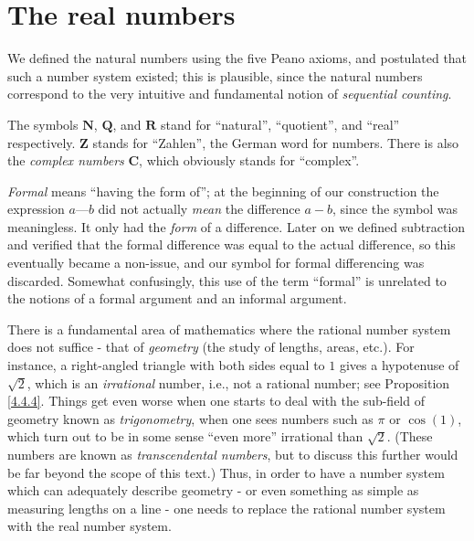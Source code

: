 \chapter{The real numbers}\label{ch 5}

\begin{note}
    We defined the natural numbers using the five Peano axioms, and postulated that such a number system existed;
    this is plausible, since the natural numbers correspond to the very intuitive and fundamental notion of \emph{sequential counting}.
\end{note}

\begin{note}
    The symbols \(\mathbf{N}\), \(\mathbf{Q}\), and \(\mathbf{R}\) stand for ``natural'', ``quotient'', and ``real'' respectively.
    \(\mathbf{Z}\) stands for ``Zahlen'', the German word for numbers.
    There is also the \emph{complex numbers} \(\mathbf{C}\), which obviously stands for ``complex''.
\end{note}

\begin{note}
    \emph{Formal} means ``having the form of'';
    at the beginning of our construction the expression \(a \text{---} b\) did not actually \emph{mean} the difference \(a - b\), since the symbol \text{---} was meaningless.
    It only had the \emph{form} of a difference.
    Later on we defined subtraction and verified that the formal difference was equal to the actual difference, so this eventually became a non-issue, and our symbol for formal differencing was discarded.
    Somewhat confusingly, this use of the term ``formal'' is unrelated to the notions of a formal argument and an informal argument.
\end{note}

\begin{note}
    There is a fundamental area of mathematics where the rational number system does not suffice - that of \emph{geometry}
    (the study of lengths, areas, etc.).
    For instance, a right-angled triangle with both sides equal to \(1\) gives a hypotenuse of \(\sqrt{2}\), which is an \emph{irrational} number, i.e., not a rational number;
    see Proposition \ref{4.4.4}.
    Things get even worse when one starts to deal with the sub-field of geometry known as \emph{trigonometry}, when one sees numbers such as \(\pi\) or \(\cos(1)\), which turn out to be in some sense ``even more'' irrational than \(\sqrt{2}\).
    (These numbers are known as \emph{transcendental numbers}, but to discuss this further would be far beyond the scope of this text.)
    Thus, in order to have a number system which can adequately describe geometry
    - or even something as simple as measuring lengths on a line
    - one needs to replace the rational number system with the real number system.
\end{note}

